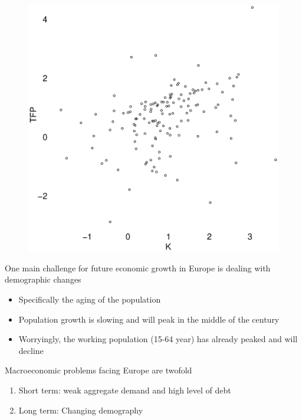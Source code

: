 \documentclass{beamer}
\begin{document}
\begin{frame}
  \begin{figure}
    \includegraphics[scale=.3]{growth2.eps}
  \end{figure}
\end{frame}


\begin{frame}
 One main challenge for future economic growth in Europe is dealing with demographic changes
 \begin{itemize}
   \item Specifically the aging of the population
   \item Population growth is slowing and will peak in the middle of the century
   \item Worryingly, the working population (15-64 year) has already peaked and will decline
 \end{itemize}
   \medskip
   Macroeconomic problems facing Europe are twofold
   \begin{enumerate}
     \item Short term: weak aggregate demand and high level of debt
     \item Long term: Changing demography 
   \end{enumerate}
\end{frame}
\end{document}
